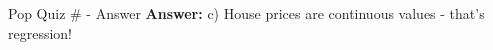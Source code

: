 \documentclass[usenames,dvipsnames]{beamer}
\begin{document}
\begin{frame}{Pop Quiz \#\thepopquiz{} - Answer}
\textbf{Answer:} c) House prices are continuous values - that's regression!
\end{frame}





%
%			
%			
%
\end{document}
